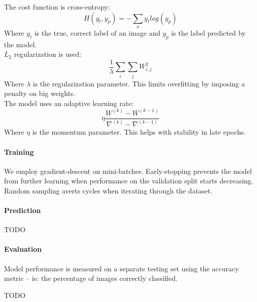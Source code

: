 \documentclass[a4paper]{article}
\begin{document}
The cost function is cross-entropy:
$$H(y_t, y_p)=-\sum_x y_t log(y_p)$$
Where $y_t$ is the true, correct label of an image and $y_p$ is the label predicted by the model.
\\

$L_2$ regularization is used:
$$\frac{1}{\lambda} \sum_i \sum_j W_{i,j}^2$$
Where $\lambda$ is the regularization parameter. This limits overfitting by imposing a penalty on big weights.
\\

The model uses an adaptive learning rate:
$$\eta \frac{ W^{(k)} - W^{(k-1)} } { \nabla^{(k)} - \nabla^{(k-1)} }$$
Where $\eta$ is the momentum parameter. This helps with stability in late epochs.

\paragraph{Training} We employ gradient-descent on mini-batches. Early-stopping prevents the model from further learning when performance on the validation split starts decreasing. Random sampling averts cycles when iterating through the dataset.

\paragraph{Prediction}
TODO

\paragraph{Evaluation}
Model performance is measured on a separate testing set using the accuracy metric -- ie: the percentage of images correctly classified.

TODO

\begin{center}
\end{center}
\end{document}
